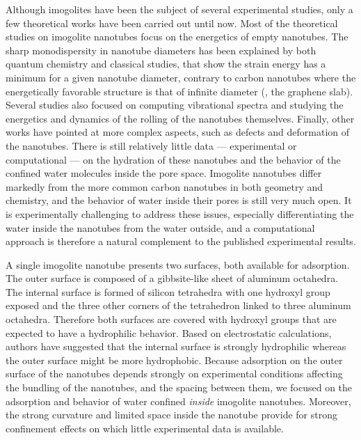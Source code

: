 \documentclass[thesis]{subfiles}
\begin{document}
Although imogolites have been the subject of several experimental studies, only
a few theoretical works have been carried out until now. Most of the theoretical
studies on imogolite nanotubes focus on the energetics of empty nanotubes. The
sharp monodispersity in nanotube diameters has been explained by both quantum
chemistry and classical studies, that show the strain energy has a minimum for a
given nanotube diameter, contrary to carbon nanotubes where the energetically
favorable structure is that of infinite diameter (\ie, the graphene
slab\cite{Tamura2002, Guimaraes2007, Zhao2009, Demichelis2010}). Several studies
also focused on computing vibrational spectra\cite{Tamura2002,
AlvarezRamirez2007, Konduri2008} and studying the energetics and dynamics of the
rolling of the nanotubes themselves\cite{Lee2011, Gonzalez2014, Gonzalez2016}.
Finally, other works have pointed at more complex aspects, such as
defects\cite{Gustafsson2001} and deformation of the nanotubes\cite{Tamura2002,
Amara2014, Creton2008}. There is still relatively little data --- experimental
or computational --- on the hydration of these nanotubes and the behavior of the
confined water molecules inside the pore space. Imogolite nanotubes differ
markedly from the more common carbon nanotubes in both geometry and chemistry,
and the behavior of water inside their pores is still very much open. It is
experimentally challenging to address these issues, especially differentiating
the water inside the nanotubes from the water outside, and a computational
approach is therefore a natural complement to the published experimental
results.

A single imogolite nanotube presents two surfaces, both available for
adsorption. The outer surface is composed of a gibbsite-like sheet of aluminum
octahedra. The internal surface is formed of silicon tetrahedra with one
hydroxyl group exposed and the three other corners of the tetrahedron linked to
three aluminum octahedra. Therefore both surfaces are covered with hydroxyl
groups that are expected to have a hydrophilic behavior. Based on electrostatic
calculations, authors have suggested that the internal surface is strongly
hydrophilic whereas the outer surface might be more
hydrophobic\cite{Gustafsson2001, Guimaraes2007}. Because adsorption on the outer
surface of the nanotubes depends strongly on experimental conditions affecting
the bundling of the nanotubes, and the spacing between them, we focused on the
adsorption and behavior of water confined \emph{inside} imogolite nanotubes.
Moreover, the strong curvature and limited space inside the nanotube provide for
strong confinement effects on which little experimental data is available.
\end{document}

